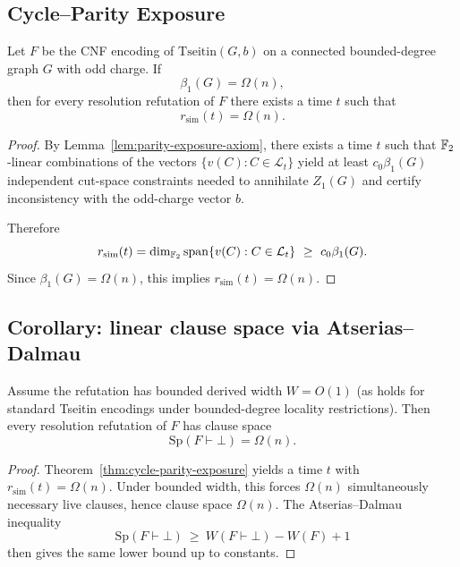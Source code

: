 \subsection{Cycle--Parity Exposure}

\begin{theorem}
\label{thm:cycle-parity-exposure}
Let $F$ be the CNF encoding of $\mathrm{Tseitin}(G,b)$ on a connected bounded-degree graph $G$ with odd charge.
If
\[
\beta_1(G)=\Omega(n),
\]
then for every resolution refutation of $F$ there exists a time $t$ such that
\[
r_{\mathrm{sim}}(t)=\Omega(n).
\]
\end{theorem}

\begin{proof}
By Lemma~\ref{lem:parity-exposure-axiom}, there exists a time $t$ such that $\mathbb{F}_2$-linear combinations of the vectors $\{v(C):C\in\mathcal{L}_t\}$ yield at least $c_0\beta_1(G)$ independent cut-space constraints needed to annihilate $Z_1(G)$ and certify inconsistency with the odd-charge vector $b$.

Therefore
\[
r_{\mathrm{sim}}(t)=\dim_{\GF}\Span\{v(C):C\in\mathcal{L}_t\}\ \ge\ c_0\beta_1(G).
\]
Since $\beta_1(G)=\Omega(n)$, this implies $r_{\mathrm{sim}}(t)=\Omega(n)$.
\end{proof}

\subsection{Corollary: linear clause space via Atserias--Dalmau}

\begin{corollary}
\label{cor:linear-space}
Assume the refutation has bounded derived width $W=O(1)$ (as holds for standard Tseitin encodings under bounded-degree locality restrictions).
Then every resolution refutation of $F$ has clause space
\[
\mathrm{Sp}(F\vdash\bot)=\Omega(n).
\]
\end{corollary}

\begin{proof}
Theorem~\ref{thm:cycle-parity-exposure} yields a time $t$ with $r_{\mathrm{sim}}(t)=\Omega(n)$.
Under bounded width, this forces $\Omega(n)$ simultaneously necessary live clauses, hence clause space $\Omega(n)$.
The Atserias--Dalmau inequality
\[
\mathrm{Sp}(F\vdash\bot)\ \ge\ W(F\vdash\bot)-W(F)+1
\]
then gives the same lower bound up to constants.
\end{proof}
